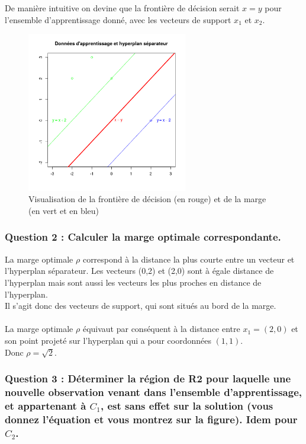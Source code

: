 \documentclass[a4paper, 10pt]{article}
\begin{document}
De manière intuitive on devine que la frontière de décision serait $x=y$ pour l'ensemble d'apprentissage donné,
avec les vecteurs de support $x_{1}$ et  $x_{2}$.
\begin{figure}[h!]
\centering
\includegraphics[height = 7cm, width = 7cm]{plots/ex1_hyperplan.png}
\caption{Visualisation de la frontière de décision (en rouge) et de la marge (en vert et en bleu)}
\end{figure}

\newpage
\subsubsection*{Question 2 : Calculer la marge optimale correspondante.}

La marge optimale $\rho$ correspond à la distance la plus courte entre un vecteur et l'hyperplan séparateur.
Les vecteurs (0,2) et (2,0) sont à égale distance de l'hyperplan mais sont aussi les vecteurs les plus proches en distance de l'hyperplan.\\
Il s'agit donc des vecteurs de support, qui sont situés au bord de la marge.\\ \\
La marge optimale $\rho$ équivaut par conséquent à la distance entre $x_{1} = (2,0)$ et son point projeté sur l'hyperplan qui 	a pour coordonnées $(1,1)$.\\
Donc $\rho = \sqrt{2}$.

\subsubsection*{Question 3 : Déterminer la région de R2 pour laquelle une nouvelle observation venant dans l’ensemble
d’apprentissage, et appartenant à $C_{1}$, est sans effet sur la solution (vous donnez l’équation et
vous montrez sur la figure). Idem pour $C_{2}$.}
\end{document}
